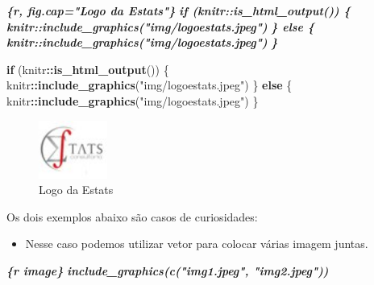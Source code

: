 \documentclass[
]{book}
\newenvironment{Shaded}{\begin{snugshade}}{\end{snugshade}}
\newcommand{\ControlFlowTok}[1]{\textcolor[rgb]{0.13,0.29,0.53}{\textbf{#1}}}
\newcommand{\InformationTok}[1]{\textcolor[rgb]{0.56,0.35,0.01}{\textbf{\textit{#1}}}}
\newcommand{\KeywordTok}[1]{\textcolor[rgb]{0.13,0.29,0.53}{\textbf{#1}}}
\newcommand{\NormalTok}[1]{#1}
\newcommand{\OperatorTok}[1]{\textcolor[rgb]{0.81,0.36,0.00}{\textbf{#1}}}
\newcommand{\StringTok}[1]{\textcolor[rgb]{0.31,0.60,0.02}{#1}}
\providecommand{\tightlist}{%
  \setlength{\itemsep}{0pt}\setlength{\parskip}{0pt}}
\begin{document}
\begin{Shaded}
\begin{Highlighting}[]
\InformationTok{\textasciigrave{}\textasciigrave{}\textasciigrave{}\{r, fig.cap="Logo da Estats"\}}
\InformationTok{if (knitr::is\_html\_output()) \{}
\InformationTok{    knitr::include\_graphics("img/logoestats.jpeg")}
\InformationTok{\} else \{}
\InformationTok{    knitr::include\_graphics("img/logoestats.jpeg")}
\InformationTok{\}}
\InformationTok{\textasciigrave{}\textasciigrave{}\textasciigrave{}}
\end{Highlighting}
\end{Shaded}

\begin{Shaded}
\begin{Highlighting}[]
\ControlFlowTok{if}\NormalTok{ (knitr}\OperatorTok{::}\KeywordTok{is\_html\_output}\NormalTok{()) \{}
\NormalTok{    knitr}\OperatorTok{::}\KeywordTok{include\_graphics}\NormalTok{(}\StringTok{"img/logoestats.jpeg"}\NormalTok{)}
\NormalTok{\} }\ControlFlowTok{else}\NormalTok{ \{}
\NormalTok{    knitr}\OperatorTok{::}\KeywordTok{include\_graphics}\NormalTok{(}\StringTok{"img/logoestats.jpeg"}\NormalTok{)}
\NormalTok{\}}
\end{Highlighting}
\end{Shaded}

\begin{figure}

{\centering \includegraphics[width=0.89in]{img/logoestats} 

}

\caption{Logo da Estats}\label{fig:unnamed-chunk-3}
\end{figure}

Os dois exemplos abaixo são casos de curiosidades:

\begin{itemize}
\tightlist
\item
  Nesse caso podemos utilizar vetor para colocar várias imagem juntas.
\end{itemize}

\begin{Shaded}
\begin{Highlighting}[]
\InformationTok{\textasciigrave{}\textasciigrave{}\textasciigrave{}\{r image\}}
\InformationTok{include\_graphics(c("img1.jpeg", "img2.jpeg"))}
\InformationTok{\textasciigrave{}\textasciigrave{}\textasciigrave{}}
\end{Highlighting}
\end{Shaded}
\end{document}
